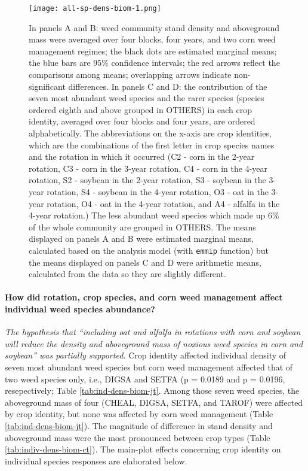\documentclass[
]{article}
\begin{document}
\begin{figure}[H]
\centering
\texttt{[image: all-sp-dens-biom-1.png]}
\caption{\label{fig:all-sp-dens-biom}In panels A and B: weed community stand density and aboveground mass were averaged over four blocks, four years, and two corn weed management regimes; the black dots are estimated marginal means; the blue bars are 95\% confidence intervals; the red arrows reflect the comparisons among means; overlapping arrows indicate non-significant differences. In panels C and D: the contribution of the seven most abundant weed species and the rarer species (species ordered eighth and above grouped in OTHERS) in each crop identity, averaged over four blocks and four years, are ordered alphabetically. The abbreviations on the x-axis are crop identities, which are the combinations of the first letter in crop species names and the rotation in which it occurred (C2 - corn in the 2-year rotation, C3 - corn in the 3-year rotation, C4 - corn in the 4-year rotation, S2 - soybean in the 2-year rotation, S3 - soybean in the 3-year rotation, S4 - soybean in the 4-year rotation, O3 - oat in the 3-year rotation, O4 - oat in the 4-year rotation, and A4 - alfalfa in the 4-year rotation.) The less abundant weed species which made up 6\% of the whole community are grouped in OTHERS. The means displayed on panels A and B were estimated marginal means, calculated based on the analysis model (with \texttt{emmip} function) but the means displayed on panels C and D were arithmetic means, calculated from the data so they are slightly different.}
\end{figure}

\hypertarget{how-did-rotation-crop-species-and-corn-weed-management-affect-individual-weed-species-abundance}{%
\paragraph*{How did rotation, crop species, and corn weed management affect individual weed species abundance?}\label{how-did-rotation-crop-species-and-corn-weed-management-affect-individual-weed-species-abundance}}

\emph{The hypothesis that ``including oat and alfalfa in rotations with corn and soybean will reduce the density and aboveground mass of noxious weed species in corn and soybean'' was partially supported.} Crop identity affected individual density of seven most abundant weed species but corn weed management affected that of two weed species only, i.e., DIGSA and SETFA (p = 0.0189 and p = 0.0196, resepectively; Table \ref{tab:ind-dens-biom-jt}. Among those seven weed species, the aboveground mass of four (CHEAL, DIGSA, SETFA, and TAROF) were affected by crop identity, but none was affected by corn weed management (Table \ref{tab:ind-dens-biom-jt}). The magnitude of difference in stand density and aboveground mass were the most pronounced between crop types (Table \ref{tab:indiv-dens-biom-ct}). The main-plot effects concerning crop identity on individual species responses are elaborated below.
\end{document}
